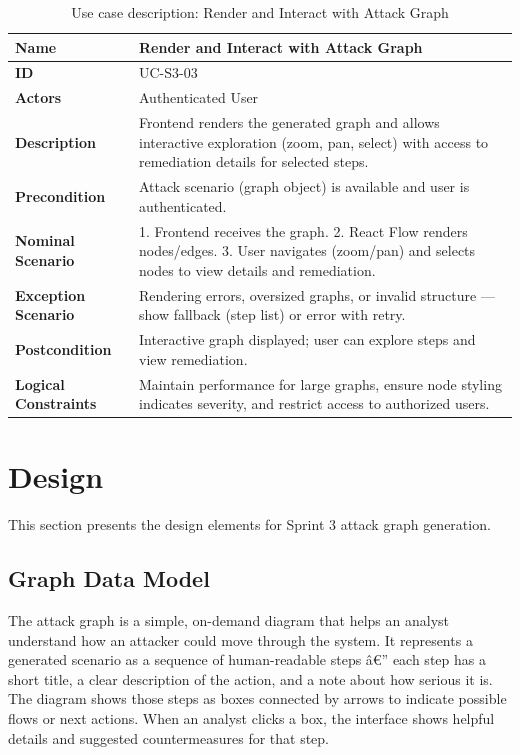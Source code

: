 \begin{table}[H]
  \centering
  \caption{Use case description: Render and Interact with Attack Graph}
  \label{tab:render-graph}
  \renewcommand{\arraystretch}{1.4}
  \small
  \begin{tabularx}{\textwidth}{|p{2.5cm}|X|}
    \hline
    \textbf{Name} & Render and Interact with Attack Graph \\\hline
    \textbf{ID} & UC-S3-03 \\\hline
    \textbf{Actors} & Authenticated User \\\hline
    \textbf{Description} & Frontend renders the generated graph and allows interactive exploration (zoom, pan, select) with access to remediation details for selected steps. \\\hline
    \textbf{Precondition} & Attack scenario (graph object) is available and user is authenticated. \\\hline
    \textbf{Nominal Scenario} & 1. Frontend receives the graph. 2. React Flow renders nodes/edges. 3. User navigates (zoom/pan) and selects nodes to view details and remediation. \\\hline
    \textbf{Exception Scenario} & Rendering errors, oversized graphs, or invalid structure — show fallback (step list) or error with retry. \\\hline
    \textbf{Postcondition} & Interactive graph displayed; user can explore steps and view remediation. \\\hline
    \textbf{Logical Constraints} & Maintain performance for large graphs, ensure node styling indicates severity, and restrict access to authorized users. \\\hline
  \end{tabularx}
\end{table}

\section{Design}

\justifying
This section presents the design elements for Sprint 3 attack graph generation.

\subsection{Graph Data Model}

The attack graph is a simple, on-demand diagram that helps an analyst understand how an attacker could move through the system. It represents a generated scenario as a sequence of human-readable steps â€” each step has a short title, a clear description of the action, and a note about how serious it is. The diagram shows those steps as boxes connected by arrows to indicate possible flows or next actions. When an analyst clicks a box, the interface shows helpful details and suggested countermeasures for that step.

